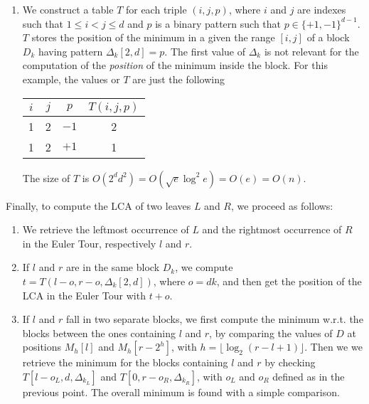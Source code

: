 \begin{enumerate}
  \item We construct a table $T$ for each triple $(i, j, p)$, where $i$ and $j$
  are indexes such that $1 \le i < j \le d$ and $p$ is a binary pattern such
  that $p \in \{+1, -1 \}^{d - 1}$. $T$ stores the position of the minimum in a
  given the range $[i, j]$ of a block $D_k$ having pattern $\Delta_k[2, d] = p$.
  The first value of $\Delta_k$ is not relevant for the computation of the
  \emph{position} of the minimum inside the block.  For this example, the values
  or $T$ are just the following
  \begin{center}
    \begin{tabular}{c|c|c||c}
      $i$ & $j$ & $p$ & $T(i, j, p)$ \\\hline
      1 & 2 & $-1$ & 2 \\
      1 & 2 & $+1$ & 1 \\
    \end{tabular}
  \end{center}
  The size of $T$ is $O(2^dd^2) = O(\sqrt{e}\log^2 e) = O(e) = O(n)$.

\end{enumerate}

Finally, to compute the LCA of two leaves $L$ and $R$, we proceed as follows:
%
\begin{enumerate}

  \item We retrieve the leftmost occurrence of $L$ and the rightmost occurrence
  of $R$ in the Euler Tour, respectively $l$ and $r$.

  \item If $l$ and $r$ are in the same block $D_k$, we compute $t = T(l - o, r -
  o, \Delta_k[2, d])$, where $o = dk$, and then get the position of the LCA in
  the Euler Tour with $t + o$.

  \item If $l$ and $r$ fall in two separate blocks, we first compute the minimum
  w.r.t. the blocks between the ones containing $l$ and $r$, by comparing the
  values of $D$ at positions $M_h[l]$ and $M_h[r - 2^h]$, with $h = \lfloor
  \log_2 (r - l + 1)\rfloor$. Then we we retrieve the minimum for the blocks
  containing $l$ and $r$ by checking $T[l - o_L, d, \Delta_{k_L}]$ and $T[0, r -
  o_R, \Delta_{k_R}]$, with $o_L$ and $o_R$ defined as in the previous point.
  The overall minimum is found with a simple comparison.

\end{enumerate}
